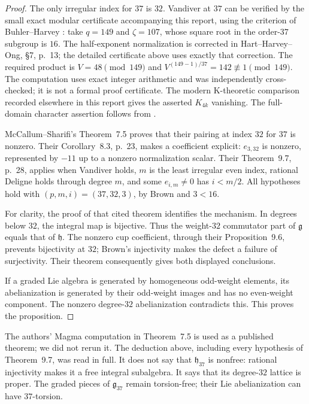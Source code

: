 \begin{proof}
The only irregular index for $37$ is $32$. Vandiver at $37$ can be verified by the small exact modular certificate accompanying this report, using the criterion of Buhler--Harvey \cite[\S4, pp.~4--5]{BuhlerHarvey2011}: take $q=149$ and $\zeta=107$, whose square root in the order-$37$ subgroup is $16$. The half-exponent normalization is corrected in Hart--Harvey--Ong, \S7, p.~13; the detailed certificate above uses exactly that correction. The required product is $V=48\pmod{149}$ and $V^{(149-1)/37}=142\not\equiv1\pmod{149}$. The computation uses exact integer arithmetic and was independently cross-checked; it is not a formal proof certificate. The modern K-theoretic comparison recorded elsewhere in this report gives the asserted $K_{4k}$ vanishing. The full-domain character assertion follows from \cite[Theorem~1.1(3)]{IshiiKummer2024}.

McCallum--Sharifi's Theorem~7.5 proves that their pairing at index $32$ for $37$ is nonzero. Their Corollary~8.3, p.~23, makes a coefficient explicit: $e_{3,32}$ is nonzero, represented by $-11$ up to a nonzero normalization scalar. Their Theorem~9.7, p.~28, applies when Vandiver holds, $m$ is the least irregular even index, rational Deligne holds through degree $m$, and some $e_{i,m}\neq0$ has $i<m/2$. All hypotheses hold with $(p,m,i)=(37,32,3)$, by Brown and $3<16$.

For clarity, the proof of that cited theorem identifies the mechanism. In degrees below $32$, the integral map is bijective. Thus the weight-$32$ commutator part of $\mathfrak g$ equals that of $\mathfrak h$. The nonzero cup coefficient, through their Proposition~9.6, prevents bijectivity at $32$; Brown's injectivity makes the defect a failure of surjectivity. Their theorem consequently gives both displayed conclusions.

If a graded Lie algebra is generated by homogeneous odd-weight elements, its abelianization is generated by their odd-weight images and has no even-weight component. The nonzero degree-$32$ abelianization contradicts this. This proves the proposition.
\end{proof}

The authors' Magma computation in Theorem~7.5 is used as a published theorem; we did not rerun it. The deduction above, including every hypothesis of Theorem~9.7, was read in full. It does not say that $\mathfrak h_{37}$ is nonfree: rational injectivity makes it a free integral subalgebra. It says that its degree-$32$ lattice is proper. The graded pieces of $\mathfrak g_{37}$ remain torsion-free; their Lie abelianization can have $37$-torsion.

